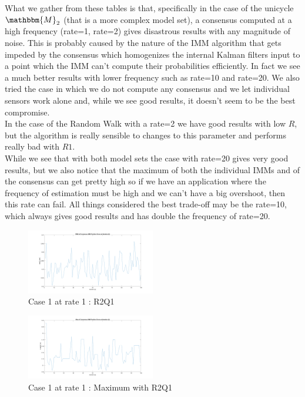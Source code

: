 \documentclass[twocolumn]{article}
\begin{document}
What we gather from these tables is that, specifically in the case of the unicycle $\mathbbm{M}_{2}$ (that is a more complex model set), 
a consensus computed at a high frequency (rate=1, rate=2) gives disastrous results with any magnitude of noise.
This is probably caused by the nature of the IMM algorithm that gets impeded by the consensus which homogenizes the internal Kalman filters input to a point which 
the IMM can't compute their probabilities efficiently. In fact we see a much better results with lower frequency such as rate=10 and rate=20.
We also tried the case in which we do not compute any consensus and we let individual sensors work alone and, while we see good results, 
it doesn't seem to be the best compromise.
\\
In the case of the Random Walk with a rate=2 we have good results with low $R$, but the algorithm is really sensible to changes to this 
parameter and performs really bad with $R1$.
\\
While we see that with both model sets the case with rate=20 gives very good results, but we also notice that the maximum of both the individual 
IMMs and of the consensus can get pretty high so if we have an application where the frequency of estimation must be high and we can't 
have a big overshoot, then this rate can fail.
All things considered the best trade-off may be the rate=10, which always gives good results and has double the frequency of rate=20.
\\
\begin{figure}[h!]
    \centering
    \includegraphics[width=0.50\textwidth]{Immagini/RMSIMMC2_20R2Q1.png}
    \caption{Case 1 at rate 1 : R2Q1}
    \label{fig:number}
\end{figure}
\begin{figure}[h!]
    \centering
    \includegraphics[width=0.50\textwidth]{Immagini/maxIMMC2_20R2Q1.png}
    \caption{Case 1 at rate 1 : Maximum with R2Q1}
    \label{fig:number}
\end{figure}
\end{document}
